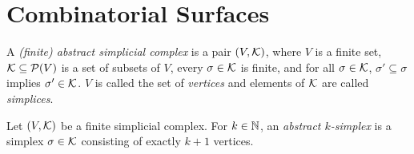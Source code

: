 \chapter{Combinatorial Surfaces}
\label{chap:combo_surfaces}



\begin{definition}
  \label{def:fin_abstr_simpl_complex}
  \leanok
  A \emph{(finite) abstract simplicial complex} is a pair $(V,\mathcal{K})$, 
  where $V$ is a finite set, 
  $\mathcal{K} \subseteq \mathcal{P}(V)$ is a set of subsets of $V$, 
  every $\sigma \in \mathcal{K}$ is finite, 
  and for all $\sigma \in \mathcal{K}$, 
  $\sigma' \subseteq \sigma$ implies $\sigma' \in \mathcal{K}$. 
  $V$ is called the set of \emph{vertices} 
  and elements of $\mathcal{K}$ are called \emph{simplices}.
\end{definition}

\begin{definition}
  \label{def:fin_abstr_simplex}
  \leanok
  Let $(V,\mathcal{K})$ be a finite simplicial complex. 
  For $k \in \mathbb{N}$, an \emph{abstract $k$-simplex} is 
  a simplex $\sigma \in \mathcal{K}$ consisting of exactly $k+1$ vertices.
\end{definition}
